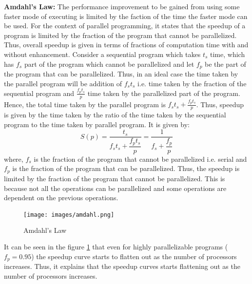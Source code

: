 \documentclass[12pt]{article}
\begin{document}
\begin{itemize}
    \textbf{Amdahl's Law: }The performance improvement to be gained from using some faster mode of executing is limited by the faction of the time the faster mode can be used. For the context of parallel programming,
    it states that the speedup of a program is limited by the fraction of the program that cannot be parallelized. Thus, overall speedup is given in terms of fractions of computation time with and without enhancement. Consider a sequential program which takes $t_s$ time, which has $f_s$ part of the program which cannot be parallelized and let 
    $f_p$ be the part of the program that can be parallelized. Thus, in an ideal case the time taken by the parallel program will be addition of $f_st_s$ i.e. time taken by the fraction of the sequential program and $\frac{f_pt_s}{p}$ time taken by the parallelized part of the program. Hence, the total time taken by the parallel program is $f_st_s + \frac{f_pt_s}{p}$.
    Thus, speedup is given by the time taken by the ratio of the time taken by the sequential program to the time taken by parallel program. It is given by:
    \[ S(p)=\dfrac{t_s}{f_st_s+\dfrac{f_pt_s}{p}}=\dfrac{1}{f_s+\dfrac{f_p}{p}}\]
    where, $f_s$ is the fraction of the program that cannot be parallelized i.e. serial and $f_p$ is the fraction of the program that can be parallelized. Thus, the speedup is limited by the fraction of the program that cannot be parallelized.
    This is because not all the operations can be parallelized and some operations are dependent on the previous operations.
    \begin{figure}[H]
        \centering
        \texttt{[image: images/amdahl.png]}
        \caption{Amdahl's Law}
        \label{fig:amdahl}
    \end{figure}
    It can be seen in the figure \ref{fig:amdahl} that even for highly parallelizable programs ($f_p=0.95$) the speedup curve starts to flatten out as the number of processors increases.
    Thus, it explains that the speedup curves starts flattening out as the number of processors increases. 


\end{itemize}
\end{document}

